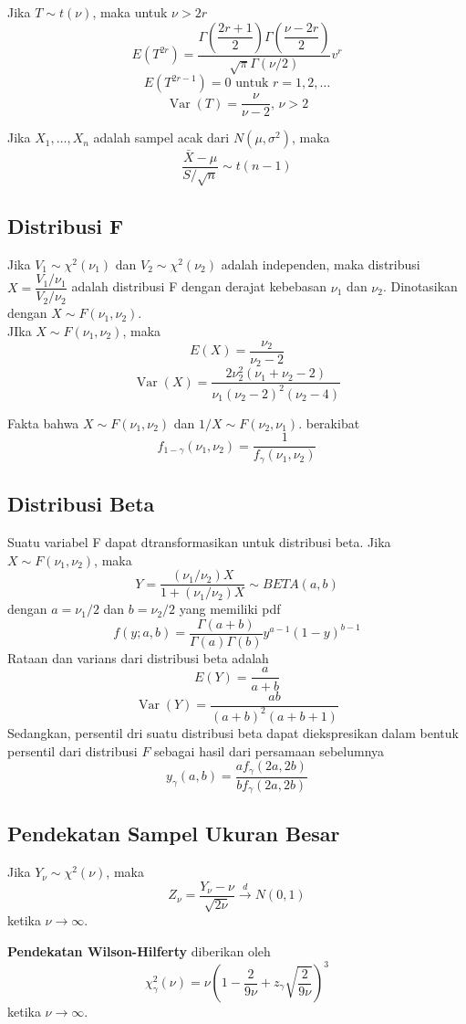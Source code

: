 \documentclass[a4paper,extrafontsizes, 9pt]{memoir}
\DeclareMathOperator{\Var}{Var}
\begin{document}
\begin{multicols}{3}
                Jika $T\sim t(\nu)$, maka untuk $\nu>2r$
                \[E(T^{2r})=\dfrac{\Gamma\left(\dfrac{2r+1}{2}\right)\Gamma\left(\dfrac{\nu-2r}{2}\right)}{\sqrt{\pi}\Gamma(\nu/2)}v^r\]
                \[E(T^{2r-1})=0 \text{ untuk } r=1,2,\dots\]
                \[\Var(T)=\dfrac{\nu}{\nu-2},\,\nu>2\]

                Jika $X_1,\dots,X_n$ adalah sampel acak dari $N(\mu,\sigma^2)$, maka
                \[\dfrac{\bar{X}-\mu}{S/\sqrt{n}}\sim t(n-1)\]

            \subsection*{\small Distribusi F}
                Jika $V_1\sim\chi^2(\nu_1)$ dan $V_2\sim\chi^2(\nu_2)$ adalah independen, maka distribusi $X=\dfrac{V_1/\nu_1}{V_2/\nu_2}$ adalah distribusi F dengan derajat kebebasan $\nu_1$ dan $\nu_2$. Dinotasikan dengan $X\sim F(\nu_1,\nu_2)$.\\

                JIka $X\sim F(\nu_1,\nu_2)$, maka
                \[E(X)=\dfrac{\nu_2}{\nu_2-2}\]
                \[\Var(X)=\dfrac{2\nu_2^2(\nu_1+\nu_2-2)}{\nu_1(\nu_2-2)^2(\nu_2-4)}\]

                Fakta bahwa $X\sim F(\nu_1,\nu_2)$ dan $1/X\sim F(\nu_2,\nu_1)$. berakibat 
                \[f_{1-\gamma}(\nu_1,\nu_2)=\dfrac{1}{f_{\gamma}(\nu_1,\nu_2)}\]

            \subsection*{\small Distribusi Beta}
                Suatu variabel F dapat dtransformasikan untuk distribusi beta. Jika $X\sim F(\nu_1,\nu_2)$, maka
                \[Y=\dfrac{(\nu_1/\nu_2)X}{1+(\nu_1/\nu_2)X}\sim BETA\left(a,b\right)\]
                dengan $a=\nu_1/2$ dan $b=\nu_2/2$ yang memiliki pdf 
                \[f(y;a,b)=\dfrac{\Gamma(a+b)}{\Gamma(a)\Gamma(b)}y^{a-1}(1-y)^{b-1}\]
                Rataan dan varians dari distribusi beta adalah
                \[E(Y)=\dfrac{a}{a+b}\]
                \[\Var(Y)=\dfrac{ab}{(a+b)^2(a+b+1)}\]
                Sedangkan, persentil dri suatu distribusi beta dapat diekspresikan dalam bentuk persentil dari distribusi $F$ sebagai hasil dari persamaan sebelumnya
                \[y_\gamma(a,b)=\frac{af_{\gamma}(2a,2b)}{bf_{\gamma}(2a,2b)}\]
            
            \subsection*{\small Pendekatan Sampel Ukuran Besar}
                Jika $Y_\nu\sim \chi^2(\nu)$, maka
                \[Z_\nu=\dfrac{Y_\nu-\nu}{\sqrt{2\nu}}\xrightarrow{d}N(0,1)\]
                ketika $\nu\to\infty$.

                \textbf{Pendekatan Wilson-Hilferty} diberikan oleh
                \[\chi^2_{\gamma}(\nu)=\nu\left(1-\dfrac{2}{9\nu}+z_{\gamma}\sqrt{\dfrac{2}{9\nu}}\right)^3\]
                ketika $\nu\to\infty$.
	\end{multicols}
\end{document}
